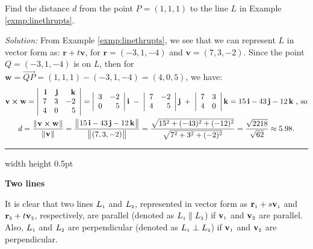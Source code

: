\begin{exmp}
 Find the distance $d$ from the point $P = (1,1,1)$ to the line $L$ in Example \ref{exmp:linethrupts}.\smallskip
 \par\noindent\emph{Solution:} 
 From Example \ref{exmp:linethrupts}, we see that we can represent $L$ in vector form as:
 $\textbf{r} + t \textbf{v}$, for $\textbf{r} = (-3,1,-4)$ and $\textbf{v} = (7,3,-2)$. 
 Since the point $Q = (-3,1,-4)$
 is on $L$, then for $\textbf{w} = \overrightarrow{QP} = (1,1,1) - (-3,1,-4) = (4,0,5)$, we have:
 \begin{gather*}
  \textbf{v} \bm{\times} \textbf{w} = \left|\begin{array}{rrr}\textbf{i} & \textbf{j} & \textbf{k}\\7 & 3 & -2\\
   4 & 0 & 5\end{array}\right|
   = \left|\begin{array}{rr}3 & -2\\0 & 5\end{array}\right| \textbf{i} \;-\;
     \left|\begin{array}{rr}7 & -2\\4 & 5\end{array}\right| \textbf{j} \;+\;
     \left|\begin{array}{rr}7 & 3\\4 & 0\end{array}\right| \textbf{k}
   = 15\,\textbf{i} - 43\,\textbf{j} - 12\,\textbf{k} \text{~,~so}\\
  d = \frac{\lVert\mspace{1mu}\textbf{v} \bm{\times} \textbf{w}\mspace{1mu}\rVert}{\lVert\mspace{1mu}\textbf{v}\mspace{1mu}\rVert} =
   \frac{\bigl\lVert\mspace{1mu}15\,\textbf{i} - 43\,\textbf{j} - 12\,\textbf{k}\mspace{1mu}\bigr\rVert}{\bigl\lVert\mspace{1mu}(7,3,-2)\mspace{1mu}\bigr\rVert}
  = \frac{\sqrt{15^2 + (-43)^2 + (-12)^2}}{\sqrt{7^2 + 3^2 + (-2)^2}}
  = \frac{\sqrt{2218}}{\sqrt{62}} \approx 5.98.
 \end{gather*}
\end{exmp}
\hrule width \textwidth height 0.5pt
\medskip
\par\noindent\textbf{\large{Two lines}}\normalsize
\smallskip

It is clear that two lines $L_{\scriptscriptstyle 1}$ and $L_{\scriptscriptstyle 2}$, represented in vector form as
$\textbf{r}_{\scriptscriptstyle 1} + s \textbf{v}_{\scriptscriptstyle 1}$ and $\textbf{r}_{\scriptscriptstyle 2} + t \textbf{v}_{\scriptscriptstyle 2}$, respectively, are
parallel (denoted as $L_{\scriptscriptstyle 1} \parallel L_{\scriptscriptstyle 2}$) if $\textbf{v}_{\scriptscriptstyle 1}$ and $\textbf{v}_{\scriptscriptstyle 2}$ are
parallel. 
Also, $L_{\scriptscriptstyle 1}$ and $L_{\scriptscriptstyle 2}$ are perpendicular (denoted as $L_{\scriptscriptstyle 1} \perp L_{\scriptscriptstyle 2}$) if
$\textbf{v}_{\scriptscriptstyle 1}$ and $\textbf{v}_{\scriptscriptstyle 2}$ are perpendicular.

